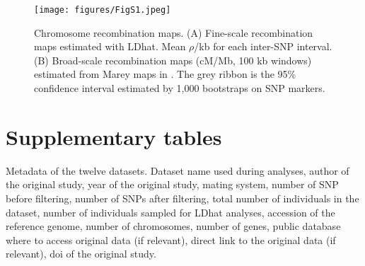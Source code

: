 \documentclass{article}
\begin{document}
\setcounter{figure}{0}


\begin{figure}[!htb]
  \texttt{[image: figures/FigS1.jpeg]}
  \centering
  \caption{Chromosome recombination maps. (A) Fine-scale recombination maps estimated with LDhat. Mean $\rho$/kb for each inter-SNP interval. (B) Broad-scale recombination maps (cM/Mb, 100 kb windows) estimated from Marey maps in \cite{brazierDiversityDeterminantsRecombination2022b}. The grey ribbon is the 95\% confidence interval estimated by 1,000 bootstraps on SNP markers.
  }
  \label{figure:FigS1}
\end{figure}



\clearpage

\section*{Supplementary tables}

\renewcommand{\thetable}{S\arabic{table}}

\setcounter{table}{0}

\begin{table}[h!]
\centering
\caption{Metadata of the twelve datasets. Dataset name used during analyses, author of the original study, year of the original study, mating system, number of SNP before filtering, number of SNPs after filtering, total number of individuals in the dataset, number of individuals sampled for LDhat analyses, accession of the reference genome, number of chromosomes, number of genes, public database where to access original data (if relevant), direct link to the original data (if relevant), doi of the original study.}
\label{table:TableS1}
\end{table}
\end{document}
